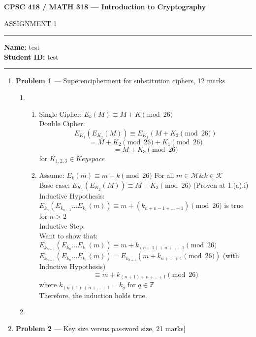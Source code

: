 \documentclass[11pt]{article}
\theoremstyle{definition}
\begin{document}
	\begin{center}
		{\bf \Large CPSC 418 / MATH 318 --- Introduction to Cryptography
		
		ASSIGNMENT 1 %
		}
	\end{center}
	
	\hrule 	
	
	\textbf{Name:} test  \\
	\textbf{Student ID:} test 
	
	\medskip \hrule
	
	\begin{enumerate}
	
		\item[] \textbf{Problem 1} --- Superencipherment for substitution ciphers, 12 marks
	
	\begin{enumerate}
		\item
		\begin{enumerate}
			\item Single Cipher: $E_{k}(M) \equiv M + K \pmod{26}$\\
				Double Cipher:\\
				\[E_{K_{1}}(E_{K_{2}}(M)) \equiv E_{K_{1}}(M+K_{2}\pmod{26})\]
				\[= M + K_{2}\pmod{26} + K_{1}\pmod{26}\]
				\[= M + K_{3}\pmod{26}\]
				for $K_{1,2,3} \in Keyspace$
			\item Assume: $E_{k}(m) \equiv m + k\pmod{26}$ For all $m \in \mathcal{M} \& k \in \mathcal{K}$\\
			Base case: $E_{K_{1}}(E_{K_{2}}(M)) \equiv  M + K_{3}\pmod{26}$ (Proven at 1.(a).i)\\
			Inductive Hypothesis: $E_{k_{n}}(E_{k_{n-1}}...E_{k_{1}}(m)) \equiv m + (k_{n+n-1+...+1} ) \pmod{26}$ is true for $n > 2 $\\
			Inductive Step:\\
			Want to show that: $E_{k_{n+1}}(E_{k_{n}}...E_{k_{1}}(m)) \equiv m + k_{(n+1)+n+..+1} \pmod{26}$\\
			$E_{k_{n+1}}(E_{k_{n}}...E_{k_{1}}(m)) = E_{k_{k+1}}(m+k_{n+...+1}\pmod{26})$ (with Inductive Hypothesis)
			\[\equiv m + k_{(n+1) + n + .. +1} \pmod{26} \] where $k_{(n+1) + n+...+1} = k_q$ for $q \in \mathbb{Z} $\\
			Therefore, the induction holds true.
		\end{enumerate}
		\item
		
	\end{enumerate}
	
	
		\item[] \textbf{Problem 2} --- Key size versus password size, 21 marks]
	

\end{enumerate}
\end{document}
